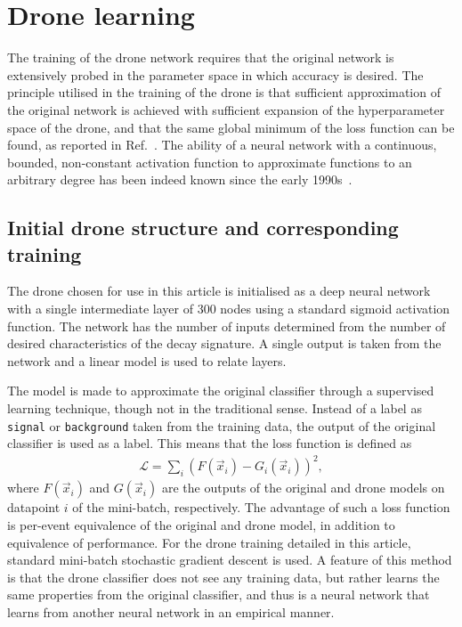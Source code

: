 \section{Drone learning}
\label{sec:dlearn}

The training of the drone network requires that the original network is
extensively probed in the parameter space in which accuracy is desired.
The principle utilised in the training of the drone is that sufficient
approximation of the original network is achieved with sufficient expansion
of the hyperparameter space of the drone, and that the same global minimum
of the loss function can be found, as reported in Ref.~\cite{losssurfaces}.
The ability of a neural network with a continuous, bounded, non-constant activation
function to approximate functions to an arbitrary degree has been indeed known
since the early 1990s~\cite{HORNIK1991251}.

\subsection{Initial drone structure and corresponding training}

The drone chosen for use in this article is initialised as a
deep neural network with a single intermediate layer of 300
nodes using a standard sigmoid activation function. The network
has the number of inputs determined from the number of desired
characteristics of the decay signature. A single output is taken
from the network and a linear model is used to relate layers. 

The model is made to approximate the original classifier through
a supervised learning technique, though not in the traditional sense.
Instead of a label as {\tt signal} or {\tt background} taken from the training data, the 
output of the original classifier is used as a label. This means that the
loss function is defined as
\begin{align}
\mathcal{L} = \sum_i \left( F(\vec{x}_i) - G_i(\vec{x}_i) \right)^2,
\end{align}
where $F(\vec{x}_i)$ and $G(\vec{x}_i)$ are the outputs 
of the original and drone models on datapoint
$i$ of the mini-batch, respectively. The advantage of such a loss function is per-event
equivalence of the original and drone model, in addition to equivalence
of performance. For the drone training detailed in this article, standard
mini-batch stochastic gradient descent is used. A feature of this method
is that the drone classifier does not see any training data,
but rather learns the same properties from the original classifier,
and thus is a neural network that learns from another neural network in an
empirical manner.

